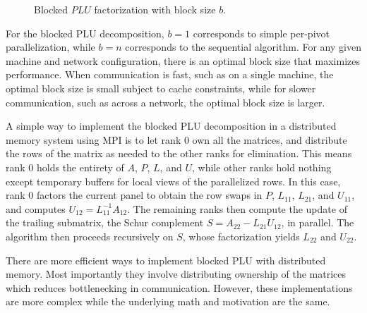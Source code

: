 \begin{figure}[t]
  \centering
  \caption{Blocked $PLU$ factorization with block size $b$.}
\end{figure}

For the blocked PLU decomposition, $b = 1$ corresponds to simple per-pivot parallelization, while $b = n$ corresponds to the sequential algorithm.
For any given machine and network configuration, there is an optimal block size that maximizes performance.
When communication is fast, such as on a single machine, the optimal block size is small subject to cache constraints, while for slower communication, such as across a network, the optimal block size is larger.

A simple way to implement the blocked PLU decomposition in a distributed memory system using MPI is to let rank 0 own all the matrices, and distribute the rows of the matrix as needed to the other ranks for elimination.
This means rank 0 holds the entirety of $A$, $P$, $L$, and $U$, while other ranks hold nothing except temporary buffers for local views of the parallelized rows.
In this case, rank 0 factors the current panel to obtain the row swaps in $P$, $L_{11}$, $L_{21}$, and $U_{11}$, and computes $U_{12} = L_{11}^{-1} A_{12}$.
The remaining ranks then compute the update of the trailing submatrix, the Schur complement $S = A_{22} - L_{21} U_{12}$, in parallel.
The algorithm then proceeds recursively on $S$, whose factorization yields $L_{22}$ and $U_{22}$.

There are more efficient ways to implement blocked PLU with distributed memory.
Most importantly they involve distributing ownership of the matrices which reduces bottlenecking in communication.
However, these implementations are more complex while the underlying math and motivation are the same.

